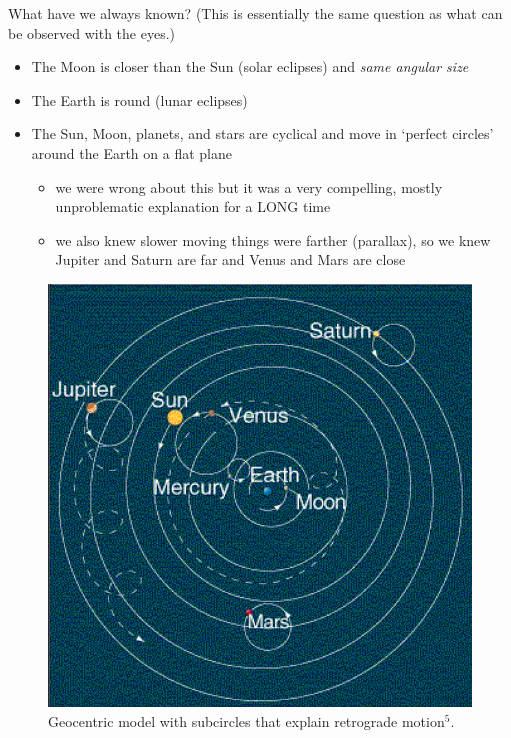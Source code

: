\documentclass[12pt]{beamer}
\begin{document}
        \begin{frame}{What have we always known?} \centering
            (This is essentially the same question as what can be observed with the eyes.)
            \begin{itemize}
                \item The Moon is closer than the Sun (solar eclipses) and \textit{same angular size}
                \item The Earth is round (lunar eclipses)
                \item The Sun, Moon, planets, and stars are cyclical and move in `perfect circles' around the Earth on a flat plane
                \pause
                \begin{itemize}
                    \item we were wrong about this but it was a very compelling, mostly unproblematic explanation for a LONG time
                    \pause
                    \item we also knew slower moving things were farther (parallax), so we knew Jupiter and Saturn are far and Venus and Mars are close
                \end{itemize}
            \end{itemize}
        \end{frame}
        \begin{frame} \centering
            \begin{figure}
                \includegraphics[scale=0.25, fbox]{geocentric.png}
                \caption{Geocentric model with subcircles that explain retrograde motion$^5$.}
            \end{figure}
        \end{frame}
\end{document}
